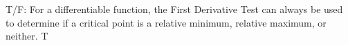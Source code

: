 {T/F: For a differentiable function, the First Derivative Test can always be used to determine if a critical point is a relative minimum, relative maximum, or neither.
}
{T
}
